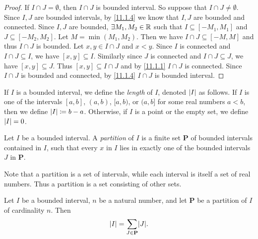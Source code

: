 \begin{proof}
  If \(I \cap J = \emptyset\), then \(I \cap J\) is bounded interval.
  So suppose that \(I \cap J \neq \emptyset\).
  Since \(I, J\) are bounded intervals, by \cref{11.1.4} we know that \(I, J\) are bounded and connected.
  Since \(I, J\) are bounded, \(\exists M_1, M_2 \in \mathbb{R}\) such that \(I \subseteq [-M_1, M_1]\) and \(J \subseteq [-M_2, M_2]\).
  Let \(M = \min(M_1, M_2)\).
  Then we have \(I \cap J \subseteq [-M, M]\) and thus \(I \cap J\) is bounded.
  Let \(x, y \in I \cap J\) and \(x < y\).
  Since \(I\) is connected and \(I \cap J \subseteq I\), we have \([x, y] \subseteq I\).
  Similarly since \(J\) is connected and \(I \cap J \subseteq J\), we have \([x, y] \subseteq J\).
  Thus \([x, y] \subseteq I \cap J\) and by \cref{11.1.1} \(I \cap J\) is connected.
  Since \(I \cap J\) is bounded and connected, by \cref{11.1.4} \(I \cap J\) is bounded interval.
\end{proof}

\setcounter{thm}{7}
\begin{defn}\label{11.1.8}
  If \(I\) is a bounded interval, we define the \emph{length} of \(I\), denoted \(\left\lvert I\right\rvert\) as follows.
  If \(I\) is one of the intervals \([a, b]\), \((a, b)\), \([a, b)\), or \((a, b]\) for some real numbers \(a < b\), then we define \(\left\lvert I\right\rvert \coloneqq b - a\).
  Otherwise, if \(I\) is a point or the empty set, we define \(\left\lvert I\right\rvert = 0\).
\end{defn}

\setcounter{thm}{9}
\begin{defn}[Partitions]\label{11.1.10}
  Let \(I\) be a bounded interval.
  A \emph{partition} of \(I\) is a finite set \(\mathbf{P}\) of bounded intervals contained in \(I\), such that every \(x\) in \(I\) lies in exactly one of the bounded intervals \(J\) in \(\mathbf{P}\).
\end{defn}

\begin{rmk}\label{11.1.11}
  Note that a partition is a set of intervals, while each interval is itself a set of real numbers.
  Thus a partition is a set consisting of other sets.
\end{rmk}

\setcounter{thm}{12}
\begin{thm}\label{11.1.13}
  Let \(I\) be a bounded interval, \(n\) be a natural number, and let \(\mathbf{P}\) be a partition of \(I\) of cardinality \(n\).
  Then
  \[
    \abs{I} = \sum_{J \in \mathbf{P}} \abs{J}.
  \]
\end{thm}

